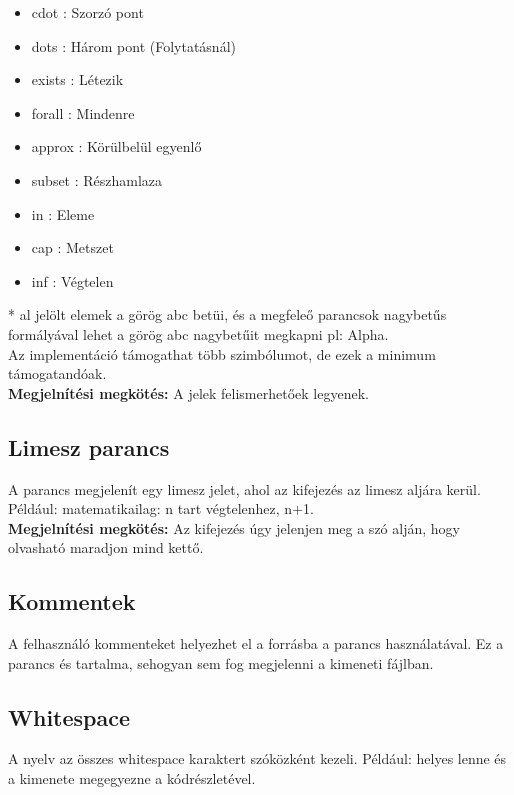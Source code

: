 \documentclass[../spec.tex]{subfiles}
\begin{document}
\begin{itemize}
        \item \tbs cdot : Szorzó pont
        \item \tbs dots : Három pont (Folytatásnál)
        \item \tbs exists : Létezik
        \item \tbs forall : Mindenre
        \item \tbs approx : Körülbelül egyenlő
        \item \tbs subset : Részhamlaza
        \item \tbs in : Eleme
        \item \tbs cap : Metszet
        \item \tbs inf : Végtelen
    \end{itemize}
    * al jelölt elemek a görög abc betüi, és a megfeleő parancsok nagybetűs formályával lehet a görög abc nagybetűit megkapni pl: \tbs Alpha.\\
    Az implementáció támogathat több szimbólumot, de ezek a minimum támogatandóak.\\
    \textbf{Megjelnítési megkötés:} A jelek felismerhetőek legyenek.

    \subsection{Limesz parancs}\label{subsec:limesz-parancs}
    A  parancs megjelenít egy limesz jelet, ahol az  kifejezés az limesz aljára kerül.\\
    Például:  matematikailag: n tart végtelenhez, n+1.\\
    \textbf{Megjelnítési megkötés:} Az  kifejezés úgy jelenjen meg a  szó alján, hogy olvasható maradjon mind kettő.

    \subsection{Kommentek}\label{subsec:kommentek}
    A felhasználó kommenteket helyezhet el a forrásba a \lang{\tbs \#\{[komment]\}} parancs használatával.
    Ez a parancs és tartalma, sehogyan sem fog megjelenni a kimeneti fájlban.

    \subsection{Whitespace}\label{subsec:whitespace}
    A nyelv az összes whitespace karaktert szóközként kezeli.
    Például:  helyes lenne és a kimenete megegyezne a  kódrészletével.
\end{document}
